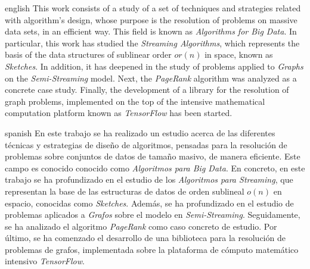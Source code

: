 \documentclass{subfiles}
\newenvironment{abstractpage}
  {\cleardoublepage\vspace*{\fill}\thispagestyle{empty}}
  {\vfill\cleardoublepage}
\newenvironment{abstract-lang}[1]
  {\bigskip\selectlanguage{#1}%
   \begin{center}\bfseries\abstractname\end{center}}
  {\par\bigskip}
\begin{document}
  \begin{abstractpage}
    \begin{abstract-lang}{english}
      This work consists of a study of a set of techniques and strategies related with algorithm's design, whose purpose is the resolution of problems on massive data sets, in an efficient way. This field is known as \emph{Algorithms for Big Data}. In particular, this work has studied the \emph{Streaming Algorithms}, which represents the basis of the data structures of sublinear order $ or (n) $ in space, known as \emph{Sketches}. In addition, it has deepened in the study of problems applied to \emph{Graphs} on the \emph{Semi-Streaming} model. Next, the \emph{PageRank} algorithm was analyzed as a concrete case study. Finally, the development of a library for the resolution of graph problems, implemented on the top of the intensive mathematical computation platform known as \emph{TensorFlow} has been started.
    \end{abstract-lang}
    \begin{abstract-lang}{spanish}
      En este trabajo se ha realizado un estudio acerca de las diferentes técnicas y estrategias de diseño de algoritmos, pensadas para la resolución de problemas sobre conjuntos de datos de tamaño masivo, de manera eficiente. Este campo es conocido conocido como \emph{Algoritmos para Big Data}. En concreto, en este trabajo se ha profundizado en el estudio de los \emph{Algoritmos para Streaming}, que representan la base de las estructuras de datos de orden sublineal $o(n)$ en espacio, conocidas como \emph{Sketches}. Además, se ha profundizado en el estudio de problemas aplicados a \emph{Grafos} sobre el modelo en \emph{Semi-Streaming}. Seguidamente, se ha analizado el algoritmo \emph{PageRank} como caso concreto de estudio. Por último, se ha comenzado el desarrollo de una biblioteca para la resolución de problemas de grafos, implementada sobre la plataforma de cómputo matemático intensivo \emph{TensorFlow}.
    \end{abstract-lang}
  \end{abstractpage}
\end{document}
